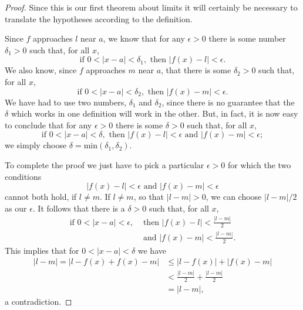 \documentclass{article}
\begin{document}
\begin{proof}
  Since this is our first theorem about limits it will certainly be necessary
  to translate the hypotheses according to the definition.

  Since $f$ approaches $l$ near $a$, we know that for any $\epsilon > 0$ there
  is some number $\delta_1 > 0$ such that, for all $x$, \begin{equation*}
    \text{if } 0 < |x - a| < \delta_1, \text{ then } |f(x) - l| < \epsilon.
  \end{equation*} 
  We also know, since $f$ approaches $m$ near $a$, that there is some $\delta_2
  > 0$ such that, for all $x$, \begin{equation*}
    \text{if } 0 < |x - a| < \delta_2, \text{ then } |f(x) - m| < \epsilon.
  \end{equation*}
  We have had to use two numbers, $\delta_1$ and $\delta_2$, since there is no
  guarantee that the $\delta$ which works in one definition will work in the
  other. But, in fact, it is now easy to conclude that for any $\epsilon > 0$
  there is some $\delta > 0$ such that, for all $x$, \begin{equation*}
    \text{if } 0 < |x - a| < \delta, \text{ then } |f(x) - l| < \epsilon
      \text{ and } |f(x) - m| < \epsilon;
  \end{equation*} we simply choose $\delta = \mathrm{min}(\delta_1, \delta_2)$.

  To complete the proof we just have to pick a particular $\epsilon > 0$ for
  which the two conditions \begin{equation*}
    |f(x) - l| < \epsilon\text{ and }|f(x) - m| < \epsilon
  \end{equation*} cannot both hold, if $l \neq m$. If $l \neq m$, so that $|l -
  m| > 0$, we can choose $|l - m|/2$ as our $\epsilon$. It follows that there
  is a $\delta > 0$ such that, for all $x$, \begin{align*}
    \text{if } 0 < |x - a| < \epsilon,
      &\text{ then } |f(x) - l| < \frac{|l - m|}{2} \\
      &\text{ and } |f(x) - m| < \frac{|l - m|}{2}.
  \end{align*}
  This implies that for $0 < |x - a| < \delta$ we have \begin{align*}
    |l - m| = |l - f(x) + f(x) - m| &\leq |l - f(x)| + |f(x) - m| \\
      &< \frac{|l - m|}{2} + \frac{|l - m|}{2} \\
      &= |l - m|,
  \end{align*} a contradiction.
\end{proof}
\end{document}
